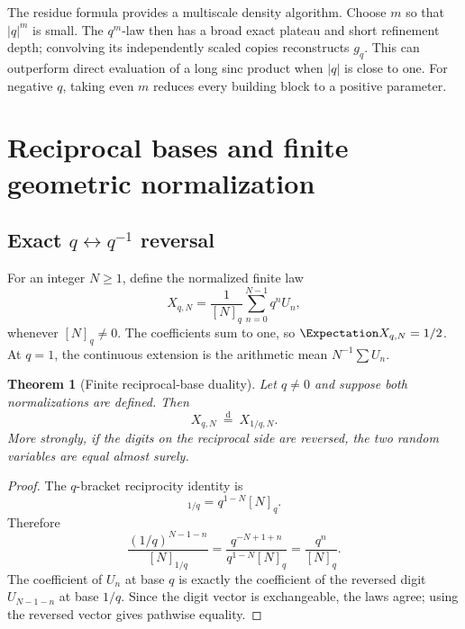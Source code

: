 \documentclass[11pt]{article}
\newtheorem{theorem}{Theorem}[section]
\theoremstyle{definition}
\newcommand{\doteqL}{\mathrel{\stackrel{\mathrm d}=}}
\begin{document}
The residue formula provides a multiscale density algorithm.  Choose \(m\) so that
\(\lvert q\rvert^m\) is small.  The \(q^m\)-law then has a broad exact plateau and short
refinement depth; convolving its independently scaled copies reconstructs \(g_q\).  This
can outperform direct evaluation of a long sinc product when \(\lvert q\rvert\) is close
to one.  For negative \(q\), taking even \(m\) reduces every building block to a positive
parameter.

\section{Reciprocal bases and finite geometric normalization}

\subsection{Exact \texorpdfstring{$q\leftrightarrow q^{-1}$}{q <-> q^-1} reversal}

For an integer \(N\ge1\), define the normalized finite law
\begin{equation}
 X_{q,N}=\frac1{[N]_q}\sum_{n=0}^{N-1}q^nU_n,             \label{eq:finite-Xq}
\end{equation}
whenever \([N]_q\ne0\).  The coefficients sum to one, so \(\Expectation X_{q,N}=1/2\).  At
\(q=1\), the continuous extension is the arithmetic mean \(N^{-1}\sum U_n\).

\begin{theorem}[Finite reciprocal-base duality]\label{thm:reciprocal-duality}
Let \(q\ne0\) and suppose both normalizations are defined.  Then
\begin{equation}
 \boxed{X_{q,N}\ \doteqL\ X_{1/q,N}.}                    \label{eq:reciprocal-law}
\end{equation}
More strongly, if the digits on the reciprocal side are reversed, the two random
variables are equal almost surely.
\end{theorem}

\begin{proof}
The $q$-bracket reciprocity identity is
\begin{equation}
 [N]_{1/q}=q^{1-N}[N]_q.                                  \label{eq:qbracket-reciprocity}
\end{equation}
Therefore
\[
 \frac{(1/q)^{N-1-n}}{[N]_{1/q}}
 =\frac{q^{-N+1+n}}{q^{1-N}[N]_q}
 =\frac{q^n}{[N]_q}.
\]
The coefficient of \(U_n\) at base \(q\) is exactly the coefficient of the reversed digit
\(U_{N-1-n}\) at base \(1/q\).  Since the digit vector is exchangeable, the laws agree;
using the reversed vector gives pathwise equality.
\end{proof}
\end{document}
